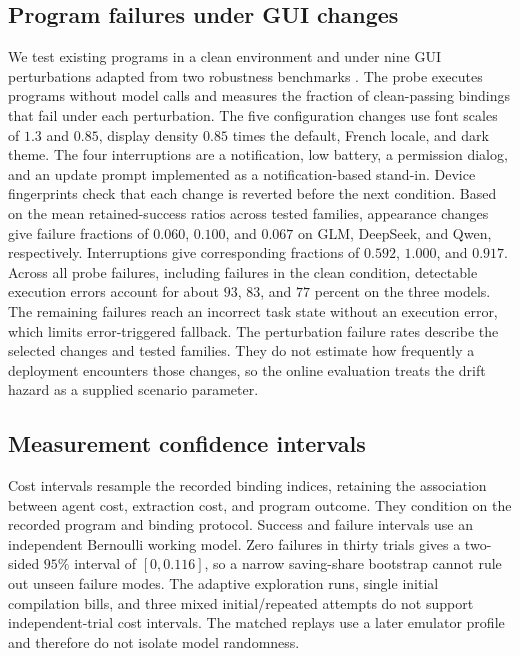 \subsection{Program failures under GUI changes}
\label{sec:fragility}
We test existing programs in a clean environment and under nine GUI perturbations adapted from two robustness benchmarks \citep{lee2025bmoca,chen2026dgara}.
The probe executes programs without model calls and measures the fraction of clean-passing bindings that fail under each perturbation.
The five configuration changes use font scales of $1.3$ and $0.85$, display density $0.85$ times the default, French locale, and dark theme.
The four interruptions are a notification, low battery, a permission dialog, and an update prompt implemented as a notification-based stand-in.
Device fingerprints check that each change is reverted before the next condition.
Based on the mean retained-success ratios across tested families, appearance changes give failure fractions of $0.060$, $0.100$, and $0.067$ on GLM, DeepSeek, and Qwen, respectively.
Interruptions give corresponding fractions of $0.592$, $1.000$, and $0.917$.
Across all probe failures, including failures in the clean condition, detectable execution errors account for about $93$, $83$, and $77$ percent on the three models.
The remaining failures reach an incorrect task state without an execution error, which limits error-triggered fallback.
The perturbation failure rates describe the selected changes and tested families.
They do not estimate how frequently a deployment encounters those changes, so the online evaluation treats the drift hazard as a supplied scenario parameter.


\subsection{Measurement confidence intervals}
\label{app:measurement-uncertainty}
Cost intervals resample the recorded binding indices, retaining the association between agent cost, extraction cost, and program outcome.
They condition on the recorded program and binding protocol.
Success and failure intervals use an independent Bernoulli working model.
Zero failures in thirty trials gives a two-sided $95\%$ interval of $[0,0.116]$, so a narrow saving-share bootstrap cannot rule out unseen failure modes.
The adaptive exploration runs, single initial compilation bills, and three mixed initial/repeated attempts do not support independent-trial cost intervals.
The matched replays use a later emulator profile and therefore do not isolate model randomness.

